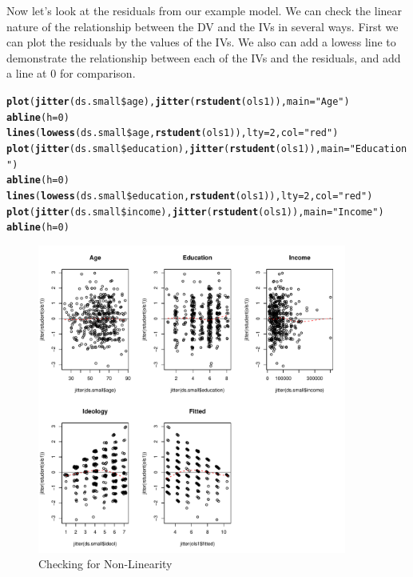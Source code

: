 \documentclass[11pt,openany]{book}\usepackage[]{graphicx}\usepackage[]{color}
\makeatletter
\newcommand{\hlnum}[1]{\textcolor[rgb]{0.686,0.059,0.569}{#1}}%
\newcommand{\hlstr}[1]{\textcolor[rgb]{0.192,0.494,0.8}{#1}}%
\newcommand{\hlopt}[1]{\textcolor[rgb]{0,0,0}{#1}}%
\newcommand{\hlstd}[1]{\textcolor[rgb]{0.345,0.345,0.345}{#1}}%
\newcommand{\hlkwc}[1]{\textcolor[rgb]{0.333,0.667,0.333}{#1}}%
\newcommand{\hlkwd}[1]{\textcolor[rgb]{0.737,0.353,0.396}{\textbf{#1}}}%
\newenvironment{kframe}{%
 \def\at@end@of@kframe{}%
 \ifinner\ifhmode%
  \def\at@end@of@kframe{\end{minipage}}%
  \begin{minipage}{\columnwidth}%
 \fi\fi%
 \def\FrameCommand##1{\hskip\@totalleftmargin \hskip-\fboxsep
 \colorbox{shadecolor}{##1}\hskip-\fboxsep
     \hskip-\linewidth \hskip-\@totalleftmargin \hskip\columnwidth}%
 \MakeFramed {\advance\hsize-\width
   \@totalleftmargin\z@ \linewidth\hsize
   \@setminipage}}%
 {\par\unskip\endMakeFramed%
 \at@end@of@kframe}
\newenvironment{knitrout}{}{} %
\renewenvironment{knitrout}{\begin{singlespace}}{\end{singlespace}}
\makeatother
\begin{document}
Now let's look at the residuals from our example model. We can check the linear nature of the relationship between the DV and the IVs in several ways. First we can plot the residuals by the values of the IVs. We also can add a lowess line to demonstrate the relationship between each of the IVs and the residuals, and add a line at $0$ for comparison. 

\begin{knitrout}
\color{fgcolor}\begin{kframe}
\begin{alltt}
\hlkwd{plot}\hlstd{(}\hlkwd{jitter}\hlstd{(ds.small}\hlopt{\$}\hlstd{age),} \hlkwd{jitter}\hlstd{(}\hlkwd{rstudent}\hlstd{(ols1)),} \hlkwc{main} \hlstd{=} \hlstr{"Age"}\hlstd{)}
\hlkwd{abline}\hlstd{(}\hlkwc{h} \hlstd{=} \hlnum{0}\hlstd{)}
\hlkwd{lines}\hlstd{(}\hlkwd{lowess}\hlstd{(ds.small}\hlopt{\$}\hlstd{age,} \hlkwd{rstudent}\hlstd{(ols1)),} \hlkwc{lty} \hlstd{=} \hlnum{2}\hlstd{,} \hlkwc{col} \hlstd{=} \hlstr{"red"}\hlstd{)}
\hlkwd{plot}\hlstd{(}\hlkwd{jitter}\hlstd{(ds.small}\hlopt{\$}\hlstd{education),} \hlkwd{jitter}\hlstd{(}\hlkwd{rstudent}\hlstd{(ols1)),} \hlkwc{main} \hlstd{=} \hlstr{"Education"}\hlstd{)}
\hlkwd{abline}\hlstd{(}\hlkwc{h} \hlstd{=} \hlnum{0}\hlstd{)}
\hlkwd{lines}\hlstd{(}\hlkwd{lowess}\hlstd{(ds.small}\hlopt{\$}\hlstd{education,} \hlkwd{rstudent}\hlstd{(ols1)),} \hlkwc{lty} \hlstd{=} \hlnum{2}\hlstd{,} \hlkwc{col} \hlstd{=} \hlstr{"red"}\hlstd{)}
\hlkwd{plot}\hlstd{(}\hlkwd{jitter}\hlstd{(ds.small}\hlopt{\$}\hlstd{income),} \hlkwd{jitter}\hlstd{(}\hlkwd{rstudent}\hlstd{(ols1)),} \hlkwc{main} \hlstd{=} \hlstr{"Income"}\hlstd{)}
\hlkwd{abline}\hlstd{(}\hlkwc{h} \hlstd{=} \hlnum{0}\hlstd{)}
\end{alltt}
\end{kframe}
\end{knitrout}
\begin{figure}
        \centering
        \includegraphics[width=4in]{15_Diagnostics/multlin.pdf}%
        \caption{Checking for Non-Linearity \label{fig:multlin}}
\end{figure}        
\end{document}
